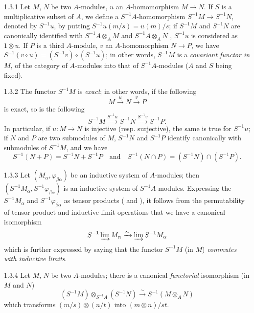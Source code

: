 \documentclass[../main.tex]{subfiles}
\begin{document}
\begin{env}{1.3.1}
Let $M$, $N$ be two $A$-modules, $u$ an $A$-homomorphism $M\to N$. If $S$ is a multiplicative subset of $A$,
we define a $S^{-1}A$-homomorphism $S^{-1}M\to S^{-1}N$, denoted by $S^{-1}u$, by putting
$S^{-1}u(m/s)=u(m)/s$; if $S^{-1}M$ and $S^{-1}N$ are canonically identified with $S^{-1}A\otimes_A M$ and
$S^{-1}A\otimes_A N$ , $S^{-1}u$ is considered as $1\otimes u$. If $P$ is a third $A$-module,
$v$ an $A$-homomorphism $N\to P$, we have $S^{-1}(v\circ u)=(S^{-1}v)\circ(S^{-1}u)$; in other words,
$S^{-1}M$ is a \emph{covariant functor in} $M$, of the category of $A$-modules into that of $S^{-1}A$-modules
($A$ and $S$ being fixed).
\end{env}

\begin{env}{1.3.2}
The functor $S^{-1}M$ is \emph{exact}; in other words, if the following
\[
  M\xrightarrow{u}N\xrightarrow{v}P
\]
is exact, so is the following
\[
  S^{-1}M\xrightarrow{S^{-1}u}S^{-1}N\xrightarrow{S^{-1}v}S^{-1}P.
\]
In particular, if $u\colon M\to N$ is injective (resp. surjective), the same is true for $S^{-1}u$;
 if $N$ and $P$ are two
submodules of $M$, $S^{-1}N$ and $S^{-1}P$ identify canonically with submodules of $S^{-1}M$, and we have
\[
  S^{-1}(N+P)=S^{-1}N+S^{-1}P\quad\text{and}\quad S^{-1}(N\cap P)=(S^{-1}N)\cap(S^{-1}P).
\]
\end{env}

\begin{env}{1.3.3}
Let $(M_\alpha,\varphi_{\beta\alpha})$ be an inductive system of $A$-modules; then
$(S^{-1}M_\alpha,S^{-1}\varphi_{\beta\alpha})$ is an inductive system of $S^{-1}A$-modules.
Expressing the $S^{-1}M_\alpha$ and $S^{-1}\varphi_{\beta\alpha}$ as tensor products ( and ),
it follows from the permutability of tensor product and inductive limit operations that we have a canonical isomorphism
\[
  S^{-1}\varinjlim M_\alpha\xrightarrow{\sim}\varinjlim S^{-1}M_\alpha
\]
which is further expressed by saying that the functor $S^{-1}M$ (in $M$) \emph{commutes with inductive limits}.
\end{env}

\begin{env}{1.3.4}
Let $M$, $N$ be two $A$-modules; there is a canonical \emph{functorial} isomorphism (in $M$ and $N$)
\[
  (S^{-1}M)\otimes_{S^{-1}A}(S^{-1}N)\xrightarrow{\sim}S^{-1}(M\otimes_A N)
\]
which transforms $(m/s)\otimes(n/t)$ into $(m\otimes n)/st$.
\end{env}
\end{document}
